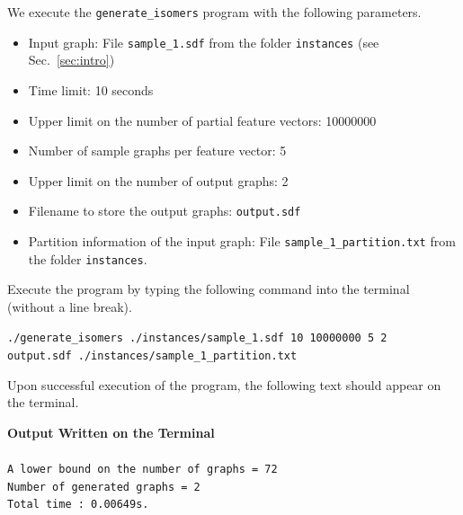 \documentclass[11pt,titlepage,dvipdfmx,twoside]{book}
\begin{document}
We execute the {\tt generate\_isomers} program with the following parameters.

\begin{itemize}
\item Input graph: File {\tt sample\_1.sdf} from the folder {\tt instances} (see Sec.~\ref{sec:intro})
\item Time limit: 10 seconds
\item Upper limit on the number of partial feature vectors: 10000000
\item Number of sample graphs per feature vector: 5
\item Upper limit on the number of output graphs: 2
\item Filename to store the output graphs: {\tt output.sdf}
\item Partition information of the input graph: File {\tt sample\_1\_partition.txt} from the folder {\tt instances}.
\end{itemize}

Execute the program by typing the following command into the terminal (without a line break).

\bigskip


{\tt ./generate\_isomers ./instances/sample\_1.sdf 10 10000000 5 2} \\
 {\tt output.sdf ./instances/sample\_1\_partition.txt}	


\bigskip

Upon successful execution of the program, the following text should appear on the terminal.

\begin{oframed}
{\bf Output Written on the Terminal}\\\\
{\tt A lower bound on the number of graphs = 72\\
Number of generated graphs = 2\\
Total time : 0.00649s.}
\end{oframed}
\end{document}

